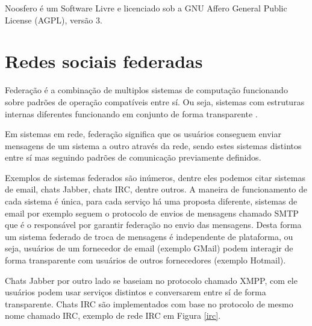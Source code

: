 \documentclass[12pt]{article}
\begin{document}
Noosfero é um Software Livre e licenciado sob a GNU Affero General Public
License (AGPL), versão 3.

\section{Redes sociais federadas}

Federação é a combinação de multiplos sistemas de computação funcionando sobre
padrões de operação compatíveis entre sí. Ou seja, sistemas com estruturas
internas diferentes funcionando em conjunto de forma transparente
\cite{federacao}.

Em sistemas em rede, federação significa que os usuários conseguem enviar
mensagens de um sistema a outro através da rede, sendo estes sistemas
distintos entre sí mas seguindo padrões de comunicação previamente definidos.

Exemplos de sistemas federados são inúmeros, dentre eles podemos citar
sistemas de email, chats Jabber, chats IRC, dentre outros. A maneira de
funcionamento de cada sistema é única, para cada serviço há uma proposta
diferente, sistemas de email por exemplo seguem o protocolo de envios de
mensagens chamado SMTP\cite{smtp} que é o responsável por garantir federação
no envio das mensagens. Desta forma um sistema federado de troca de
mensagens é independente de plataforma, ou seja, usuários de um fornecedor de
email (exemplo GMail) podem interagir de forma transparente com usuários de
outros fornecedores (exemplo Hotmail).

Chats Jabber por outro lado se baseiam no protocolo chamado XMPP\cite{xmpp},
com ele usuários podem usar serviços distintos e conversarem entre sí de forma
transparente. Chats IRC são implementados com base no protocolo de mesmo nome
chamado IRC\cite{irc}, exemplo de rede IRC em Figura \ref{irc}.
\end{document}
